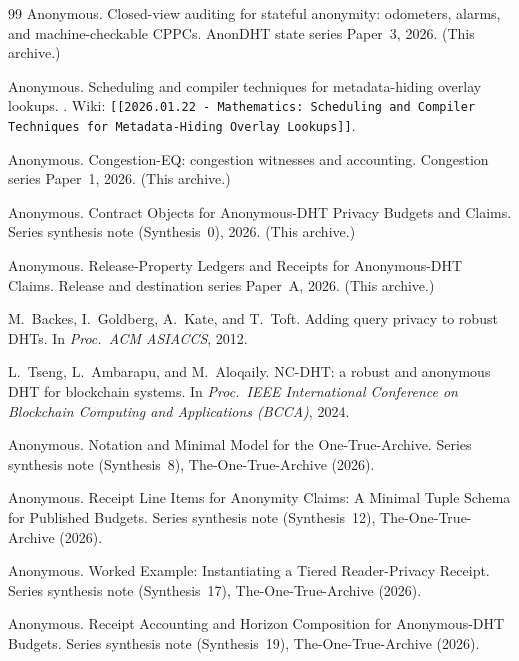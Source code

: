 \documentclass[11pt]{article}
\begin{document}
\begin{thebibliography}{99}
Anonymous.
\newblock Closed-view auditing for stateful anonymity: odometers, alarms, and machine-checkable CPPCs.
\newblock AnonDHT state series Paper~3, 2026. (This archive.)

Anonymous.
\newblock Scheduling and compiler techniques for metadata-hiding overlay lookups.
. Wiki: \texttt{[[2026.01.22 - Mathematics: Scheduling and Compiler Techniques for Metadata-Hiding Overlay Lookups]]}.

Anonymous.
\newblock Congestion-EQ: congestion witnesses and accounting.
\newblock Congestion series Paper~1, 2026. (This archive.)

Anonymous.
\newblock Contract Objects for Anonymous-DHT Privacy Budgets and Claims.
\newblock Series synthesis note (Synthesis~0), 2026. (This archive.)

Anonymous.
\newblock Release-Property Ledgers and Receipts for Anonymous-DHT Claims.
\newblock Release and destination series Paper~A, 2026. (This archive.)

M.~Backes, I.~Goldberg, A.~Kate, and T.~Toft.
\newblock Adding query privacy to robust DHTs.
\newblock In \emph{Proc.\ ACM ASIACCS}, 2012.

L.~Tseng, L.~Ambarapu, and M.~Aloqaily.
\newblock NC-DHT: a robust and anonymous DHT for blockchain systems.
\newblock In \emph{Proc.\ IEEE International Conference on Blockchain Computing and Applications (BCCA)}, 2024.


Anonymous.
\newblock Notation and Minimal Model for the One-True-Archive.
\newblock Series synthesis note (Synthesis~8), The-One-True-Archive (2026).

Anonymous.
\newblock Receipt Line Items for Anonymity Claims: A Minimal Tuple Schema for Published Budgets.
\newblock Series synthesis note (Synthesis~12), The-One-True-Archive (2026).

Anonymous.
\newblock Worked Example: Instantiating a Tiered Reader-Privacy Receipt.
\newblock Series synthesis note (Synthesis~17), The-One-True-Archive (2026).

Anonymous.
\newblock Receipt Accounting and Horizon Composition for Anonymous-DHT Budgets.
\newblock Series synthesis note (Synthesis~19), The-One-True-Archive (2026).

\end{thebibliography}
\end{document}
